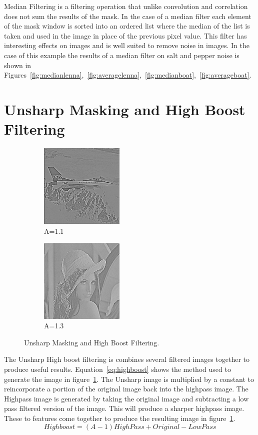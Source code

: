 \documentclass[letterpaper,10pt]{article}
\begin{document}
Median Filtering is a filtering operation that unlike convolution and correlation does not sum the results of the mask. In the case of a median filter each element of the mask window is sorted into an ordered list where the median of the list is taken and used in the image in place of the previous pixel value. This filter has interesting effects on images and is well suited to remove noise in images. In the case of this example the results of a median filter on salt and pepper noise is shown in Figures~\ref{fig:medianlenna},~\ref{fig:averagelenna},~\ref{fig:medianboat},~\ref{fig:averageboat}.
\section{Unsharp Masking and High Boost Filtering}
  \begin{figure}[hbtp]
    \centering
    \begin{subfigure}{4cm}
      \includegraphics[width=4cm]{images/unsharp_highboost_f16_1-1.png}
      \caption{A=1.1}
    \end{subfigure}
    \begin{subfigure}{4cm}
      \includegraphics[width=4cm]{images/unsharp_highboost_lenna_1-3.png}
      \caption{A=1.3}
    \end{subfigure}
    \caption{Unsharp Masking and High Boost Filtering.}
    \label{fig:unsharp}
  \end{figure}
The Unsharp High boost filtering is combines several filtered images together to produce useful results. Equation~\ref{eq:highboost} shows the method used to generate the image in figure~\ref{fig:unsharp}. The Unsharp image is multiplied by a constant to reincorporate a portion of the original image back into the highpass image. The Highpass image is generated by taking the original image and subtracting a low pass filtered version of the image. This will produce a sharper highpass image. These to features come together to produce the resulting image in figure~\ref{fig:unsharp}.
\begin{equation}
 Highboost = (A-1)HighPass + Original - LowPass
 \label{eq:highboost}
\end{equation}
\end{document}
